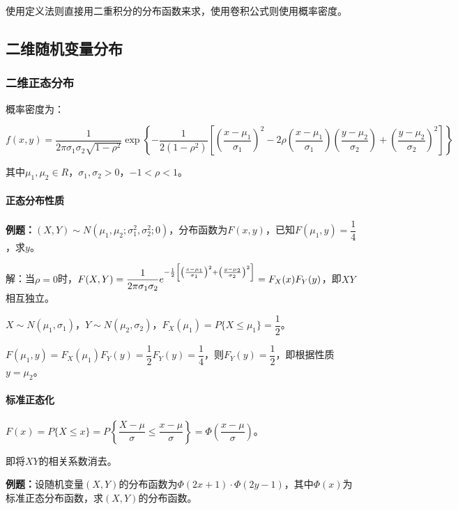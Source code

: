 \documentclass[UTF8, 12pt]{ctexart}
\begin{document}
使用定义法则直接用二重积分的分布函数来求，使用卷积公式则使用概率密度。

\subsection{二维随机变量分布}

\subsubsection{二维正态分布}

概率密度为：

{\fontsize{8.2pt}{10pt}$f(x,y)=\dfrac{1}{2\pi\sigma_1\sigma_2\sqrt{1-\rho^2}}\exp\left\{-\dfrac{1}{2(1-\rho^2)}\left[\left(\dfrac{x-\mu_1}{\sigma_1}\right)^2-2\rho\left(\dfrac{x-\mu_1}{\sigma_1}\right)\left(\dfrac{y-\mu_2}{\sigma_2}\right)+\left(\dfrac{y-\mu_2}{\sigma_2}\right)^2\right]\right\}$}

其中$\mu_1,\mu_2\in R$，$\sigma_1,\sigma_2>0$，$-1<\rho<1$。

\paragraph{正态分布性质} \leavevmode \medskip

\textbf{例题：}$(X,Y)\sim N(\mu_1,\mu_2;\sigma_1^2,\sigma_2^2;0)$，分布函数为$F(x,y)$，已知$F(\mu_1,y)=\dfrac{1}{4}$，求$y$。

解：当$\rho=0$时，$F(X,Y)=\dfrac{1}{2\pi\sigma_1\sigma_2}e^{-\frac{1}{2}\left[\left(\frac{x-\mu_1}{\sigma_1}\right)^2+\left(\frac{y-\mu_2}{\sigma_2}\right)^2\right]}\\=F_X(x)F_Y(y)$，即$XY$相互独立。

$X\sim N(\mu_1,\sigma_1)$，$Y\sim N(\mu_2,\sigma_2)$，$F_X(\mu_1)=P\{X\leqslant\mu_1\}=\dfrac{1}{2}$。

$F(\mu_1,y)=F_X(\mu_1)F_Y(y)=\dfrac{1}{2}F_Y(y)=\dfrac{1}{4}$，则$F_Y(y)=\dfrac{1}{2}$，即根据性质$y=\mu_2$。

\paragraph{标准正态化} \leavevmode \medskip

$F(x)=P\{X\leqslant x\}=P\left\{\dfrac{X-\mu}{\sigma}\leqslant\dfrac{x-\mu}{\sigma}\right\}=\varPhi\left(\dfrac{x-\mu}{\sigma}\right)$。

即将$XY$的相关系数消去。

\textbf{例题：}设随机变量$(X,Y)$的分布函数为$\varPhi(2x+1)\cdot\varPhi(2y-1)$，其中$\varPhi(x)$为标准正态分布函数，求$(X,Y)$的分布函数。
\end{document}
